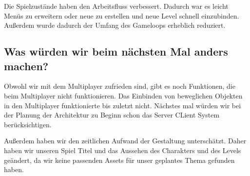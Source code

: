 \documentclass[12pt, a4paper, twoside]{article}
\begin{document}
Die Spielzustände haben den Arbeitsfluss verbessert. Dadurch war es leicht Menüs zu erweitern oder 
neue zu erstellen und neue Level schnell einzubinden. Außerdem wurde dadurch der Umfang des Gameloops 
erheblich reduziert.


\subsection{Was würden wir beim nächsten Mal anders machen?}
Obwohl wir mit dem Multiplayer zufrieden sind, gibt es noch Funktionen, die beim Multiplayer nicht 
funktionieren. Das Einbinden von beweglichen Objekten in den Multiplayer funktionierte bis zuletzt nicht.
Nächstes mal würden wir bei der Planung der Architektur zu Beginn schon das Server CLient System berücksichtigen.

Außerdem haben wir den zeitlichen Aufwand der Gestaltung unterschätzt. Daher haben wir unseren Spiel Titel
und das Aussehen des Charakters und des Levels geändert, da wir keine passenden Assets für unser
geplantes Thema gefunden haben.


\end{document}
